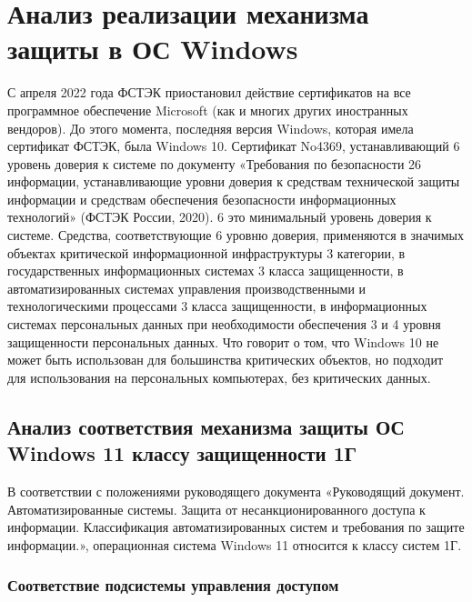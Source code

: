 \documentclass[a4paper, 14pt]{report}
\begin{document}
\section{Анализ реализации механизма защиты в ОС Windows}
С апреля 2022 года ФСТЭК приостановил действие сертификатов на все программное обеспечение Microsoft (как и многих других иностранных вендоров).
До этого момента, последняя версия Windows, которая имела сертификат ФСТЭК, была Windows 10. Сертификат No4369, устанавливающий 6 уровень доверия к системе по документу
«Требования по безопасности 26 информации, устанавливающие уровни доверия к
средствам технической защиты информации и средствам обеспечения безопасности
информационных технологий» (ФСТЭК России, 2020). 6 это минимальный уровень доверия к системе.
Средства, соответствующие 6 уровню доверия, применяются в значимых объектах критической информационной инфраструктуры 3 категории, в государственных информационных системах 3 класса защищенности, в автоматизированных системах управления производственными и технологическими процессами 3 класса защищенности, в информационных системах персональных данных при необходимости обеспечения 3 и 4 уровня защищенности персональных данных.
Что говорит о том, что Windows 10 не может быть использован для большинства критических объектов, но подходит для использования на персональных компьютерах, без критических данных.

\subsection{Анализ соответствия механизма защиты ОС Windows 11 классу защищенности 1Г}
В соответствии с положениями руководящего документа «Руководящий документ. Автоматизированные системы. Защита от несанкционированного доступа к информации. Классификация автоматизированных систем и требования по защите информации.», операционная система Windows 11 относится к классу систем 1Г.
\subsubsection{Соответствие подсистемы управления доступом}
\end{document}
